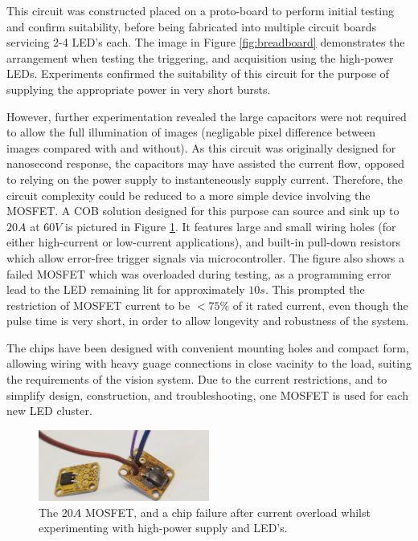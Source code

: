 \documentclass[fleqn,twoside,12pt]{report}
\begin{document}
This circuit was constructed placed on a proto-board to perform initial testing and confirm suitability, before being fabricated into multiple circuit boards servicing 2-4 LED's each. The image in Figure \ref{fig:breadboard} demonstrates the arrangement when testing the triggering, and acquisition using the high-power LEDs. Experiments confirmed the suitability of this circuit for the purpose of supplying the appropriate power in very short bursts. 

However, further experimentation revealed the large capacitors were not required to allow the full illumination of images (negligable pixel difference between images compared with and without). As this circuit was originally designed for nanosecond response, the capacitors may have assisted the current flow, opposed to relying on the power supply to instanteneously supply current. Therefore, the circuit complexity could be reduced to a more simple device involving the MOSFET. A COB solution designed for this purpose can source and sink up to $20A$ at $60V$ is pictured in Figure \ref{fig:mosfet}. It features large and small wiring holes (for either high-current or low-current applications), and built-in pull-down resistors which allow error-free trigger signals via microcontroller. The figure also shows a failed MOSFET which was overloaded during testing, as a programming error lead to the LED remaining lit for approximately $10s$. This prompted the restriction of MOSFET current to be $<75\%$ of it rated current, even though the pulse time is very short, in order to allow longevity and robustness of the system.

The chips have been designed with convenient mounting holes and compact form, allowing wiring with heavy guage connections in close vacinity to the load, suiting the requirements of the vision system. Due to the current restrictions, and to simplify design, construction, and troubleshooting, one MOSFET is used for each new LED cluster. 

\begin{figure}
	\begin{center}
		\includegraphics[width=0.5\textwidth]{mosfet.png}
	\end{center}
	\caption{The $20A$ MOSFET, and a chip failure after current overload whilst experimenting with high-power supply and LED's.}
	\label{fig:mosfet}
\end{figure} 
\end{document}
